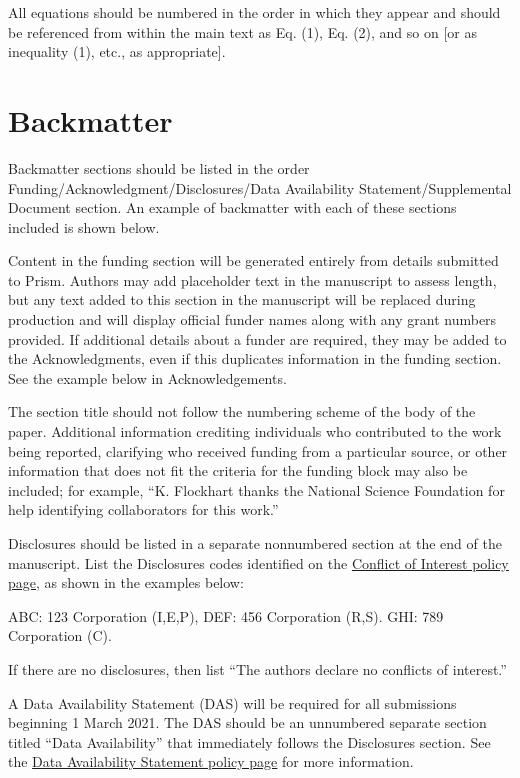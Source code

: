 \documentclass{optica-article}
\begin{document}
All equations should be numbered in the order in which they appear
and should be referenced  from within the main text as Eq. (1),
Eq. (2), and so on [or as inequality (1), etc., as appropriate].

\section{Backmatter}

Backmatter sections should be listed in the order Funding/Acknowledgment/Disclosures/Data Availability Statement/Supplemental Document section. An example of backmatter with each of these sections included is shown below.

\begin{backmatter}
Content in the funding section will be generated entirely from details submitted to Prism. Authors may add placeholder text in the manuscript to assess length, but any text added to this section in the manuscript will be replaced during production and will display official funder names along with any grant numbers provided. If additional details about a funder are required, they may be added to the Acknowledgments, even if this duplicates information in the funding section. See the example below in Acknowledgements.

The section title should not follow the numbering scheme of the body of the paper. Additional information crediting individuals who contributed to the work being reported, clarifying who received funding from a particular source, or other information that does not fit the criteria for the funding block may also be included; for example, ``K. Flockhart thanks the National Science Foundation for help identifying collaborators for this work.'' 

Disclosures should be listed in a separate nonnumbered section at the end of the manuscript. List the Disclosures codes identified on the \href{https://opg.optica.org/submit/review/conflicts-interest-policy.cfm}{Conflict of Interest policy page}, as shown in the examples below:

\medskip

\noindent ABC: 123 Corporation (I,E,P), DEF: 456 Corporation (R,S). GHI: 789 Corporation (C).

\medskip

\noindent If there are no disclosures, then list ``The authors declare no conflicts of interest.''


A Data Availability Statement (DAS) will be required for all submissions beginning 1 March 2021. The DAS should be an unnumbered separate section titled ``Data Availability'' that
immediately follows the Disclosures section. See the \href{https://opg.optica.org/submit/review/data-availability-policy.cfm}{Data Availability Statement policy page} for more information.


\end{backmatter}
\end{document}
